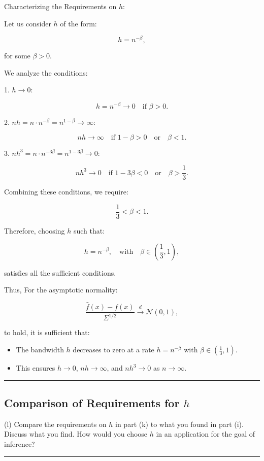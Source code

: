 \documentclass{article}
\newenvironment{colorparagraph}[1]{\par\color{#1}}{\par}
\begin{document}
Characterizing the Requirements on \( h \):

Let us consider \( h \) of the form:

\[
h = n^{-\beta},
\]

for some \( \beta > 0 \).

We analyze the conditions:

1. \( h \to 0 \):

\[
h = n^{-\beta} \to 0 \quad \text{if } \beta > 0.
\]

2. \( n h = n \cdot n^{-\beta} = n^{1 - \beta} \to \infty \):

\[
n h \to \infty \quad \text{if } 1 - \beta > 0 \quad \text{or} \quad \beta < 1.
\]

3. \( n h^3 = n \cdot n^{-3\beta} = n^{1 - 3\beta} \to 0 \):

\[
n h^3 \to 0 \quad \text{if } 1 - 3\beta < 0 \quad \text{or} \quad \beta > \frac{1}{3}.
\]

Combining these conditions, we require:

\[
\frac{1}{3} < \beta < 1.
\]

Therefore, choosing \( h \) such that:

\[
h = n^{-\beta}, \quad \text{with} \quad \beta \in \left( \frac{1}{3}, 1 \right),
\]

satisfies all the sufficient conditions.

Thus, For the asymptotic normality:

\[
\frac{\hat{f}(x) - f(x)}{\Sigma^{1/2}} \xrightarrow{d} \mathcal{N}(0, 1),
\]

to hold, it is sufficient that:

\begin{itemize}
    \item The bandwidth \( h \) decreases to zero at a rate \( h = n^{-\beta} \) with \( \beta \in \left( \frac{1}{3}, 1 \right) \).
    \item This ensures \( h \to 0 \), \( n h \to \infty \), and \( n h^3 \to 0 \) as \( n \to \infty \).
\end{itemize}

\begin{colorparagraph}{questioncolor}
\label{q2l}
\rule{\textwidth}{0.5pt}
\subsection{Comparison of Requirements for \( h \)}
(l) Compare the requirements on \( h \) in part (k) to what you found in part (i). Discuss what you find. How would you choose \( h \) in an application for the goal of inference?

\rule{\textwidth}{0.5pt}
\end{colorparagraph}
\end{document}
